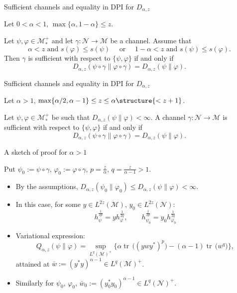 \documentclass[mathserif]{beamer}
\newcommand{\<}{\langle}
\renewcommand{\>}{\rangle}
\newcommand{\Tr}{\operatorname{tr}\,}
\newcommand{\Me}{\mathcal M}
\newcommand{\Ne}{\mathcal N}
\begin{document}
\begin{frame}{Sufficient channels and equality in DPI for $D_{\alpha,z}$}

Let $0<\alpha<1$, $\max\{\alpha,1-\alpha\}\le z$.

\bigskip

 Let $\psi,\varphi\in \Me_*^+$ and let $\gamma:\Ne\to\Me$ be a channel. Assume that
 \[
\alpha<z\text{ and } s(\varphi)\le s(\psi)\quad\text{ or }\quad 1-\alpha<z\text{ and }
s(\psi)\le s(\varphi).
 \]
Then $\gamma$ is sufficient with respect to $\{\psi,\varphi\}$ if and only if 
\[
D_{\alpha,z}(\psi\circ\gamma\|\varphi\circ\gamma)=D_{\alpha,z}(\psi\|\varphi).
\]


\end{frame}

\begin{frame}{Sufficient channels and equality in DPI for $D_{\alpha,z}$}

Let $\alpha>1$, $\max\{\alpha/2,\alpha-1\}\le z\le \alpha\structure{<z+1}$.

\bigskip

Let $\psi,\varphi\in \Me_*^+$ be such that $D_{\alpha,z}(\psi\|\varphi)<\infty$. A channel
$\gamma: \Ne\to \Me$ is sufficient with respect to $\{\psi,\varphi\}$ if and only if
\[
D_{\alpha,z}(\psi\circ\gamma\|\varphi\circ\gamma)=D_{\alpha,z}(\psi\|\varphi).
\]

\end{frame}


\begin{frame}{A sketch of proof for $\alpha>1$}

Put $\psi_0:=\psi\circ\gamma$, $\varphi_0:=\varphi\circ\gamma$, $p=\frac{z}{\alpha}$,
$q=\frac{z}{\alpha-1}>1$.
\medskip

\begin{itemize}
\item By the assumptions, $D_{\alpha,z}(\psi_0\|\varphi_0)\le
D_{\alpha,z}(\psi\|\varphi)<\infty$.
\item In this case, for some $y\in L^{2z}(\Me)$, $y_0\in L^{2z}(\Ne)$: 
\[
h_\psi^{\frac1{2p}}=yh_\varphi^{\frac1{2q}},\qquad
h_{\psi_0}^{\frac1{2p}}=y_0h_{\varphi_0}^{\frac1{2q}}
\]
\item Variational expression:
\[
Q_{\alpha,z}(\psi\|\varphi)=\sup_{L^q(\Me)^+}\bigl\{\alpha\Tr\bigl((ywy^*)^p\bigr)-(\alpha-1)\Tr\bigl(w^q\bigr)\bigr\},
\]
  attained at $\bar w:=(y^*y)^{\alpha-1}\in L^q(\Me)^+$.
\medskip 

\item Similarly for $\psi_0$, $\varphi_0$, $\bar w_0:=(y_0^*y_0)^{\alpha-1}\in
L^q(\Ne)^+$.
\end{itemize}


\end{frame}
\end{document}

